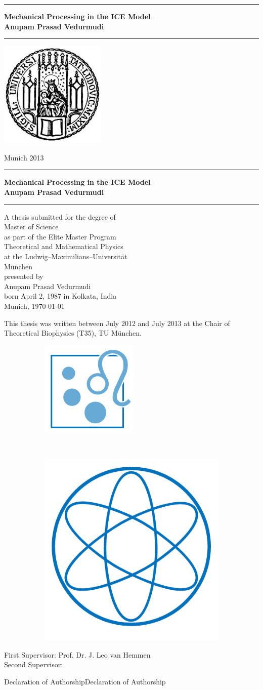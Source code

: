 \documentclass[12pt]{book}
\newcommand{\LMUTitle}[9]{
  \thispagestyle{empty}
  \vspace*{\stretch{1}}
  {\parindent0cm
   \rule{\linewidth}{.7ex}}
  \begin{flushright}

    \vspace*{\stretch{1}}
    \sffamily\bfseries\Huge
    #1\\
    \vspace*{\stretch{1}}
    \sffamily\bfseries\large
    #2
    \vspace*{\stretch{1}}
  \end{flushright}
  \rule{\linewidth}{.7ex}
  \vspace*{\stretch{5}}
  \begin{center}
    \includegraphics[width=2in]{siegel}
  \end{center}
  \vspace*{\stretch{1}}
  \begin{center}\sffamily\LARGE{#5}\end{center}
  \newpage
  \thispagestyle{empty}

  \cleardoublepage
  \thispagestyle{empty}

  \vspace*{\stretch{1}}
  {\parindent0cm
  \rule{\linewidth}{.7ex}}
  \begin{flushright}
    \vspace*{\stretch{1}}	
    \sffamily\bfseries\Huge
    #1\\
    \vspace*{\stretch{1}}
    \sffamily\bfseries\large
    #2
    \vspace*{\stretch{1}}
  \end{flushright}
  \rule{\linewidth}{.7ex}

  \vspace*{\stretch{3}}
  \begin{center}
      A thesis submitted for the degree of\\
      Master of Science\\
      as part of the Elite Master Program\\
      Theoretical and Mathematical Physics\\
      at the Ludwig--Maximilians--Universit\"{a}t\\
      M\"unchen\\
    \vspace*{\stretch{1}}
      presented by\\
      #2\\
      born April 2, 1987 in #3\\
    \vspace*{\stretch{2}}
      Munich, #6
  \end{center}

  \newpage
  \thispagestyle{empty}
  \noindent This thesis was written between July 2012 and July 2013 at the Chair of Theoretical Biophysics (T35), TU M\"{u}nchen.\\
  \vspace*{\stretch{1}}  
  \begin{figure}[htb!]
        \begin{subfigure}[b]{.5\textwidth}
         \flushleft
                \includegraphics[width=.3\textwidth]{Diagrams/T35logo.png}
        \end{subfigure}%
        ~ %
        \begin{subfigure}[b]{0.5\textwidth}
        \flushright
                \includegraphics[width=.3\textwidth]{Diagrams/physik_logo2.png}
        \end{subfigure}
\end{figure}

  \begin{flushleft}
    \large First Supervisor:  #7 \\[1mm]
    \large Second Supervisor: #8 \\[1mm]
  \end{flushleft}

  \cleardoublepage
}
\begin{document}
  \frontmatter


  \LMUTitle
      {Mechanical Processing in the ICE Model
       }               %
      {Anupam Prasad Vedurmudi}                      %
      {Kolkata, India}                             %
      {Faculty of Physics}                         %
      {Munich 2013}                          %
      {\today}                            %
      {Prof. Dr. J. Leo van Hemmen}                          %
      {}                         %

 
 \markboth{Declaration of Authorship}{Declaration of Authorship}
 
 
 
 
 
  \tableofcontents


  \listoffigures


  \listoftables
  \cleardoublepage

  


  \mainmatter\setcounter{page}{1}
  
  
  
   

  
%  
 

  \backmatter
  
  \markboth{}{}

%  
%  
\end{document}
